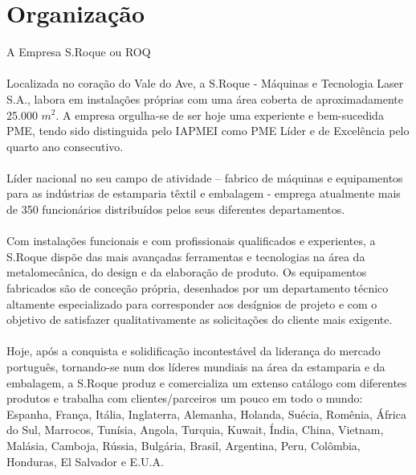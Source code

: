 \section{Organização}
\qquad A Empresa S.Roque ou ROQ \\
\\
Localizada no coração do Vale do Ave, a S.Roque - Máquinas e Tecnologia Laser S.A., labora em instalações próprias com uma área coberta de aproximadamente 25.000 $m^{2}$. A empresa orgulha-se de ser hoje uma experiente e bem-sucedida PME, tendo sido distinguida pelo IAPMEI como PME Líder e de Excelência pelo quarto ano consecutivo. \\
\\
Líder nacional no seu campo de atividade – fabrico de máquinas e equipamentos para as indústrias de estamparia têxtil e embalagem - emprega atualmente mais de 350 funcionários distribuídos pelos seus diferentes departamentos.\\
\\
Com instalações funcionais e com profissionais qualificados e experientes, a S.Roque dispõe das mais avançadas ferramentas e tecnologias na área da metalomecânica, do design e da elaboração de produto. Os equipamentos fabricados são de conceção própria, desenhados por um departamento técnico altamente especializado para corresponder aos desígnios de projeto e com o objetivo de satisfazer qualitativamente as solicitações do cliente mais exigente.\\
\\
Hoje, após a conquista e solidificação incontestável da liderança do mercado português, tornando-se num dos líderes mundiais na área da estamparia e da embalagem, a S.Roque produz e comercializa um extenso catálogo com diferentes produtos e trabalha com clientes/parceiros um pouco em todo o mundo: Espanha, França, Itália, Inglaterra, Alemanha, Holanda, Suécia, Romênia, África do Sul, Marrocos, Tunísia, Angola, Turquia, Kuwait, Índia, China, Vietnam, Malásia, Camboja, Rússia, Bulgária, Brasil, Argentina, Peru, Colômbia, Honduras, El Salvador e E.U.A.
